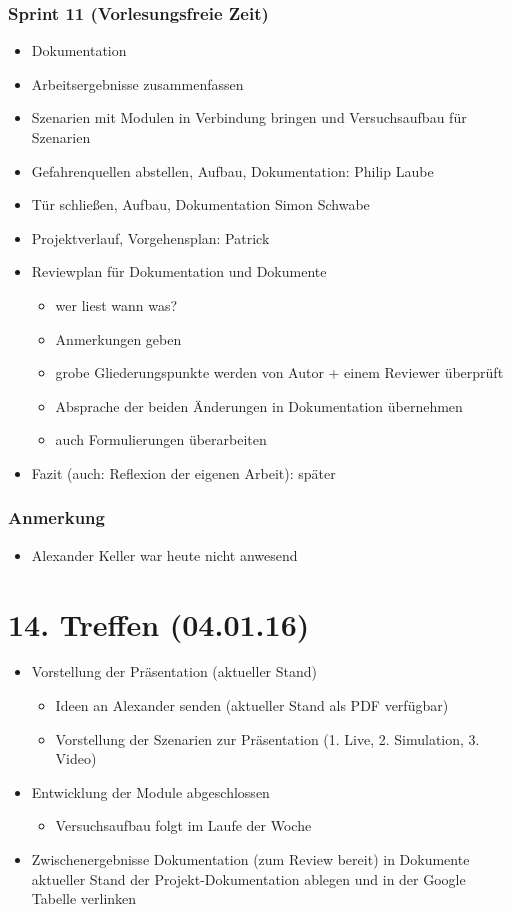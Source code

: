 \subsubsection{Sprint 11 (Vorlesungsfreie Zeit)}
\begin{itemize}
	\item Dokumentation
	\item Arbeitsergebnisse zusammenfassen
	\item Szenarien mit Modulen in Verbindung bringen und Versuchsaufbau für Szenarien
	\item Gefahrenquellen abstellen, Aufbau, Dokumentation: Philip Laube
	\item Tür schließen, Aufbau, Dokumentation Simon Schwabe
	\item Projektverlauf, Vorgehensplan: Patrick
	\item Reviewplan für Dokumentation und Dokumente
	\begin{itemize}
		\item wer liest wann was?
		\item Anmerkungen geben
		\item grobe Gliederungspunkte werden von Autor + einem Reviewer überprüft
		\item Absprache der beiden \textrightarrow{ }Änderungen in Dokumentation übernehmen
		\item auch Formulierungen überarbeiten
	\end{itemize}
	\item Fazit (auch: Reflexion der eigenen Arbeit): später
\end{itemize}

\subsubsection{Anmerkung}
\begin{itemize}
	\item Alexander Keller war heute nicht anwesend
\end{itemize}


\section{14. Treffen (04.01.16)}
\begin{itemize}
	\item Vorstellung der Präsentation (aktueller Stand)
	\begin{itemize}
		\item Ideen an Alexander senden (aktueller Stand als PDF verfügbar)
		\item Vorstellung der Szenarien zur Präsentation (1. Live, 2. Simulation, 3. Video)
	\end{itemize}
	\item Entwicklung der Module abgeschlossen
	\begin{itemize}
		\item Versuchsaufbau folgt im Laufe der Woche
	\end{itemize}
	\item Zwischenergebnisse Dokumentation (zum Review bereit) in Dokumente \textrightarrow{ }aktueller Stand der Projekt-Dokumentation ablegen und in der Google Tabelle verlinken
\end{itemize}


